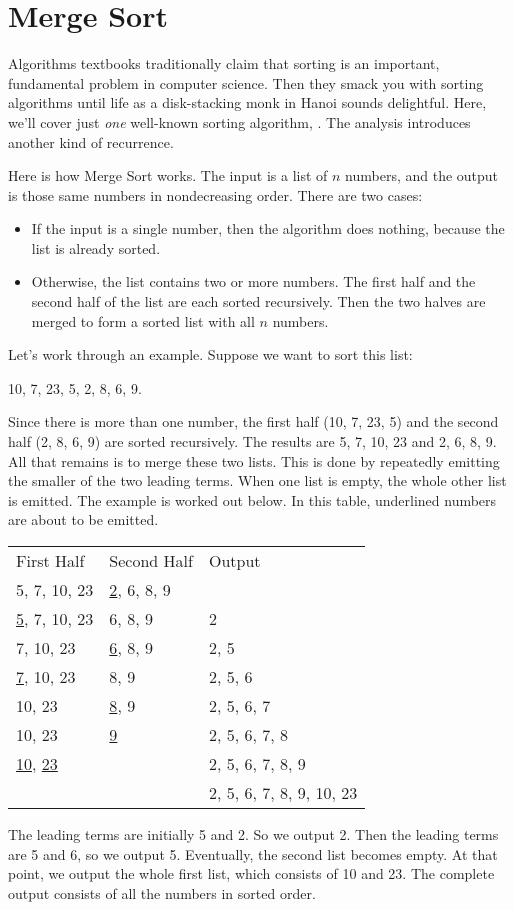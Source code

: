 \section{Merge Sort}

Algorithms textbooks traditionally claim that sorting is an important,
fundamental problem in computer science.  Then they smack you with
sorting algorithms until life as a disk-stacking monk in Hanoi sounds
delightful.  Here, we'll cover just \emph{one} well-known sorting
algorithm, .  The analysis introduces another kind of
recurrence.

Here is how Merge Sort works.  The input is a list of $n$ numbers, and
the output is those same numbers in nondecreasing order.  There are
two cases:
\begin{itemize}
\item If the input is a single number, then the algorithm does nothing,
  because the list is already sorted.
\item Otherwise, the list contains two or more numbers.  The first
  half and the second half of the list are each sorted recursively.
  Then the two halves are merged to form a sorted list with all $n$
  numbers.
\end{itemize}

Let's work through an example.  Suppose we want to sort this list:
\begin{center}
10, 7, 23, 5, 2, 8, 6, 9.
\end{center}
Since there is more than one number, the first half (10, 7, 23, 5) and
the second half (2, 8, 6, 9) are sorted recursively.  The results are
5, 7, 10, 23 and 2, 6, 8, 9.  All that remains is to merge these two
lists.  This is done by repeatedly emitting the smaller of the two
leading terms.  When one list is empty, the whole other list is
emitted.  The example is worked out below.   In this table, underlined
numbers are about to be emitted.
\begin{center}
\begin{tabular}{lll}
First Half & Second Half & Output \\
5, 7, 10, 23 & \underline{2}, 6, 8, 9 & \\
\underline{5}, 7, 10, 23 & 6, 8, 9 & 2\\
7, 10, 23 & \underline{6}, 8, 9 & 2, 5 \\
\underline{7}, 10, 23 & 8, 9 & 2, 5, 6 \\
10, 23 & \underline{8}, 9 & 2, 5, 6, 7 \\
10, 23 & \underline{9} & 2, 5, 6, 7, 8 \\
\underline{10}, \underline{23} & & 2, 5, 6, 7, 8, 9 \\
& & 2, 5, 6, 7, 8, 9, 10, 23
\end{tabular}
\end{center}
The leading terms are initially 5 and 2.  So we output 2.  Then the
leading terms are 5 and 6, so we output 5.  Eventually, the second
list becomes empty.  At that point, we output the whole first list,
which consists of 10 and 23.  The complete output consists of all the
numbers in sorted order.

